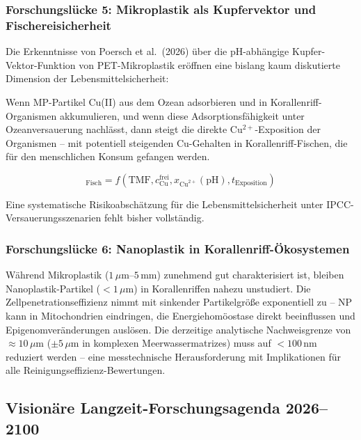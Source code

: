 ﻿\documentclass[12pt,a4paper]{article}
\theoremstyle{definition}
\theoremstyle{remark}
\newcommand{\MP}{Mikroplastik}
\begin{document}
\subsubsection{Forschungslücke 5: Mikroplastik als Kupfervektor und Fischereisicherheit}

Die Erkenntnisse von Poersch et al.\ (2026) über die pH-abhängige
Kupfer-Vektor-Funktion von PET-Mikroplastik eröffnen eine bislang kaum
diskutierte Dimension der Lebensmittelsicherheit:

Wenn MP-Partikel Cu(II) aus dem Ozean adsorbieren und in Korallenriff-Organismen
akkumulieren, und wenn diese Adsorptionsfähigkeit unter Ozeanversauerung nachlässt,
dann steigt die direkte Cu$^{2+}$-Exposition der Organismen -- mit potentiell
steigenden Cu-Gehalten in Korallenriff-Fischen, die für den menschlichen
Konsum gefangen werden.

\begin{equation}
  [\text{Cu}]_{\text{Fisch}} = f(\text{TMF}, c_{\text{Cu}}^{\text{frei}},
  x_{\text{Cu}^{2+}}(\text{pH}), t_{\text{Exposition}})
  \label{eq:fish_cu_accumulation}
\end{equation}

Eine systematische Risikoabschätzung für die Lebensmittelsicherheit unter
IPCC-Versau\-erungsszenarien fehlt bisher vollständig.

\subsubsection{Forschungslücke 6: Nanoplastik in Korallenriff-Ökosystemen}

W\"ahrend \MP{} ($1\,\mu$m--$5$\,mm) zunehmend gut charakterisiert ist,
bleiben Nanoplastik-Partikel ($< 1\,\mu$m) in Korallenriffen nahezu
unstudiert. Die Zellpenetrationseffizienz nimmt mit sinkender Partikelgr\"o\ss{}e
exponentiell zu -- NP kann in Mitochondrien eindringen, die Energiehomöostase
direkt beeinflussen und Epigenomveränderungen auslösen.
Die derzeitige analytische Nachweisgrenze von $\approx 10\,\mu$m
($\pm 5\,\mu$m in komplexen Meerwassermatrizes) muss auf $< 100$\,nm
reduziert werden -- eine messtechnische Herausforderung mit Implikationen
für alle Reinigungseffizienz-Bewertungen.

\subsection{Visionäre Langzeit-Forschungsagenda 2026--2100}
\label{subsec:forschungsagenda_2100}
\end{document}
